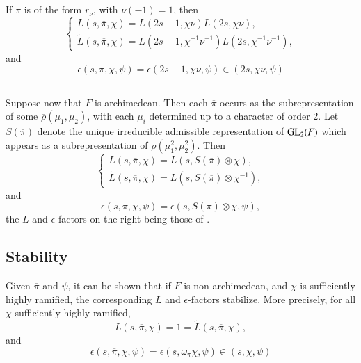\subsection{}\label{art1-sec6.4}
If $\overline{\pi}$ is of the form $r_{\nu}$, with $\nu(-1)=1$, then
$$
\begin{cases}
L(s,\overline{\pi},\chi)=L(2s-1,\chi\nu)L(2s,\chi\nu),\\
\widetilde{L}(s,\overline{\pi},\chi)=L(2s-1,\chi^{-1}\nu^{-1})L(2s,\chi^{-1}\nu^{-1}),
\end{cases}
$$
and
$$
\epsilon(s,\overline{\pi},\chi,\psi)=\epsilon(2s-1,\chi\nu,\psi)\in (2s,\chi\nu,\psi)
$$\pageoriginale

\subsection{}\label{art1-sec6.5}
Suppose now that $F$ is archimedean. Then each $\overline{\pi}$ occurs as the subrepresentation of some $\overline{\rho}(\mu_{1},\mu_{2})$, with each $\mu_{i}$ determined up to a character of order $2$. Let $S(\overline{\pi})$ denote the unique irreducible admissible representation of $\mathrm{GL}_{2}(F)$ which appears as a subrepresentation of $\rho(\mu^{2}_{1},\mu^{2}_{2})$. Then
$$
\begin{cases}
L(s,\overline{\pi},\chi)=L(s,S(\overline{\pi})\otimes \chi),\\
\widetilde{L}(s,\overline{\pi},\chi)=L(s,S(\overline{\pi})\otimes \chi^{-1}),
\end{cases}
$$
and
$$
\epsilon(s,\overline{\pi},\chi,\psi)=\epsilon(s,S(\overline{\pi})\otimes \chi, \psi),
$$
the $L$ and $\epsilon$ factors on the right being those of \cite{Jacquet-Langlands}.

\subsection{Stability}\label{art1-sec6.6}

Given $\overline{\pi}$ and $\psi$, it can be shown that if $F$ is non-archimedean, and $\chi$ is sufficiently highly ramified, the corresponding $L$ and $\epsilon$-factors stabilize. More precisely, for all $\chi$ sufficiently highly ramified,
$$
L(s,\overline{\pi},\chi)=1=\widetilde{L}(s,\overline{\pi},\chi),
$$
and
\setcounter{equation}{0}
\begin{equation}
\epsilon(s,\overline{\pi},\chi,\psi)=\epsilon(s,\omega_{\pi}\chi,\psi)\in (s,\chi,\psi)\label{art1-eq6.6.1}
\end{equation}

